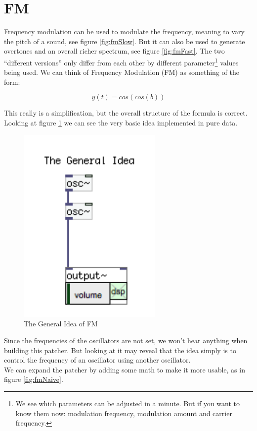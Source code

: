 \section{FM} %
\label{sub:FM}

Frequency modulation can be used to modulate the frequency, meaning to vary the pitch of a sound, see figure \ref{fig:fmSlow}. But it can also be used to generate overtones and an overall richer spectrum, see figure \ref{fig:fmFast}. The two ``different versions'' only differ from each other by different parameter\footnote{We see which parameters can be adjusted in a minute. But if you want to know them now: modulation frequency, modulation amount and carrier frequency.} values being used.
We can think of Frequency Modulation (FM) as something of the form: 

\begin{equation}
	y(t) = cos(cos(b))
\end{equation}

This really is a simplification, but the overall structure of the formula is correct. 
Looking at figure \ref{fig:fmIdea} we can see the very basic idea implemented in pure data.
\begin{figure}[H]
	\begin{center}
		\includegraphics[width = 7cm]{img/FMgeneral.png}
		\caption{The General Idea of FM}
		\label{fig:fmIdea}
	\end{center}
\end{figure}

Since the frequencies of the oscillators are not set, we won't hear anything when building this patcher. But looking at it may reveal that the idea simply is to control the frequency of an oscillator using another oscillator.\\
We can expand the patcher by adding some math to make it more usable, as in figure \ref{fig:fmNaive}.

